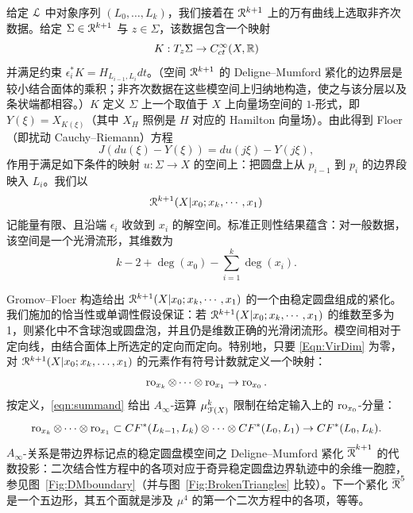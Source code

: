 给定 $\EuScript{L}$ 中对象序列 $(L_0, \ldots, L_k)$，我们接着在 $\EuScript{R}^{k+1}$ 上的万有曲线上选取非齐次数据。给定 $\Sigma \in \EuScript{R}^{k+1}$ 与 $z \in \Sigma$，该数据包含一个映射
\begin{equation}
  K : T_{z} \Sigma \to C^{\infty}_{ct}(X, \mathbb{R})
\end{equation}
并满足约束 $\epsilon_i^* K = H_{L_{i-1},L_{i}} dt$。（空间 $\EuScript{R}^{k+1}$ 的 Deligne--Mumford 紧化的边界层是较小结合面体的乘积；非齐次数据在这些模空间上归纳地构造，使之与该分层以及条状端都相容。）$K$ 定义 $\Sigma$ 上一个取值于 $X$ 上向量场空间的 $1$-形式，即 $Y(\xi) = X_{K(\xi)}$（其中 $X_H$ 照例是 $H$ 对应的 Hamilton 向量场）。由此得到 Floer（即扰动 Cauchy--Riemann）方程
\begin{equation} \label{eq:Floer_equation_0-puncture}
 J \left( du(\xi) - Y(\xi)  \right) = du(j \xi) - Y(j \xi) ,
\end{equation}
作用于满足如下条件的映射 $u: \Sigma \to X$ 的空间上：把圆盘上从 $p_{i-1}$ 到 $p_{i}$ 的边界段映入 $L_i$。我们以
\[
  \EuScript{R}^{k+1}(X | x_0; x_k ,\cdots, x_1)
\]
记能量有限、且沿端 $\epsilon_i$ 收敛到 $x_i$ 的解空间。标准正则性结果蕴含：对一般数据，该空间是一个光滑流形，其维数为
\begin{equation} \label{Eqn:VirDim}
k - 2 +  \deg(x_0) - \sum_{i=1}^k \deg(x_i).
\end{equation}

Gromov--Floer 构造给出 $  \EuScript{R}^{k+1}(X| x_0; x_k ,\cdots, x_1 )  $ 的一个由稳定圆盘组成的紧化。我们施加的恰当性或单调性假设保证：若 $\EuScript{R}^{k+1}(X | x_0; x_k ,\cdots, x_1)$ 的维数至多为 1，则紧化中不含球泡或圆盘泡，并且仍是维数正确的光滑闭流形。模空间相对于定向线，由结合面体上所选定的定向而定向。特别地，只要 \eqref{Eqn:VirDim} 为零，对 $  \EuScript{R}^{k+1}(X|x_0; x_k, \ldots, x_1) $ 的元素作有符号计数就定义一个映射：
\begin{equation} \label{eqn:summand}
   \operatorname{ro}_{x_k} \otimes  \cdots \otimes \operatorname{ro}_{x_1} \to \operatorname{ro}_{x_0}.  
\end{equation}
按定义，\eqref{eqn:summand} 给出 $A_{\infty}$-运算 $\mu_{\EuScript{F}(X)}^k$ 限制在给定输入上的 $\operatorname{ro}_{x_0}$-分量：
\begin{equation}
   \operatorname{ro}_{x_k} \otimes  \cdots \otimes \operatorname{ro}_{x_1}  \subset CF^*(L_{k-1}, L_k) \otimes \cdots \otimes CF^*(L_{0}, L_1)  \to CF^*(L_{0}, L_k).
\end{equation}
$A_{\infty}$-关系是带边界标记点的稳定圆盘模空间之 Deligne--Mumford 紧化 $\overline{\EuScript{R}}^{k+1}$ 的代数投影：二次结合性方程中的各项对应于奇异稳定圆盘边界轨迹中的余维一胞腔，参见图~\ref{Fig:DMboundary}（并与图~\ref{Fig:BrokenTriangles} 比较）。下一个紧化 $\overline{\EuScript{R}}^{5}$ 是一个五边形，其五个面就是涉及 $\mu^4$ 的第一个二次方程中的各项，等等。

